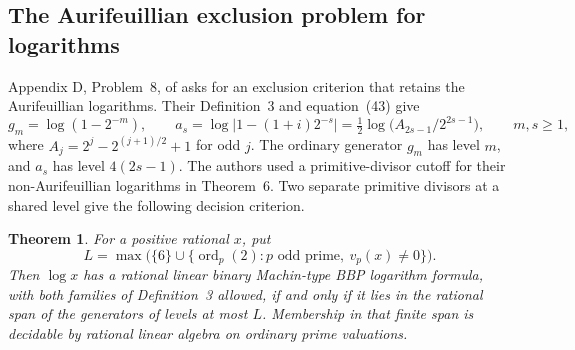 \documentclass[11pt]{article}
\newtheorem{theorem}{Theorem}[section]
\begin{document}
\subsection{The Aurifeuillian exclusion problem for logarithms}
Appendix D, Problem~8, of \cite{BBG} asks for an exclusion criterion that retains the Aurifeuillian logarithms. Their Definition~3 and equation~(43) give
\[
 g_m=\log(1-2^{-m}),\qquad
 a_s=\log\lvert 1-(1+i)2^{-s}\rvert
     =\tfrac12\log\bigl(A_{2s-1}/2^{2s-1}\bigr),\qquad m,s\ge1,
\]
where $A_j=2^j-2^{(j+1)/2}+1$ for odd $j$. The ordinary generator $g_m$ has level $m$, and $a_s$ has level $4(2s-1)$. The authors used a primitive-divisor cutoff for their non-Aurifeuillian logarithms in Theorem~6. Two separate primitive divisors at a shared level give the following decision criterion.

\begin{theorem}\label{bbg:log-exclusion}
For a positive rational $x$, put
\[
 L=\max\bigl(\{6\}\cup
   \{\operatorname{ord}_p(2):p\text{ odd prime},\ v_p(x)\ne0\}\bigr).
\]
Then $\log x$ has a rational linear binary Machin-type BBP logarithm formula, with both families of Definition~3 allowed, if and only if it lies in the rational span of the generators of levels at most $L$. Membership in that finite span is decidable by rational linear algebra on ordinary prime valuations.
\end{theorem}
\end{document}
